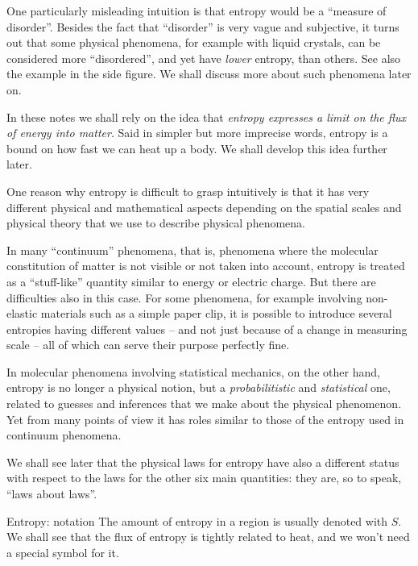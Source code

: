 \documentclass[a4paper,12pt,%
onecolumn,oneside,titlepage,%
british%
]{memoir}
\providecommand{\href}[2]{#2}
\newcommand*{\furl}[2]{\href{#1}{#2}\pagenote{\url{#1}}}
\renewcommand*{\|}[1][]{\nonscript\:#1\vert\nonscript\:\mathopen{}}
\newcommand*{\yS}{S}
\begin{document}
One particularly misleading intuition is that entropy would be a \enquote{measure of disorder}. Besides the fact that \enquote{disorder} is very vague and subjective, it turns out that some physical phenomena, for example with \furl{https://www.britannica.com/science/liquid-crystal}{liquid crystals}, can be considered more \enquote{disordered}, and yet have \emph{lower} entropy, than others. See also the example in the side figure. We shall discuss more about such phenomena later on.

In these notes we shall rely on the idea that \emph{entropy expresses a limit on the flux of energy into matter}. Said in simpler but more imprecise words, entropy is a bound on how fast we can heat up a body. We shall develop this idea further later.

One reason why entropy is difficult to grasp intuitively is that it has very different physical and mathematical aspects depending on the spatial scales and physical theory that we use to describe physical phenomena.

In many \enquote{continuum} phenomena, that is, phenomena where the molecular constitution of matter is not visible or not taken into account, entropy is treated as a \enquote{stuff-like} quantity similar to energy or electric charge. But there are difficulties also in this case. For some phenomena, for example involving non-elastic materials such as a simple paper clip, it is possible to introduce several entropies having different values -- and not just because of a change in measuring scale -- all of which can serve their purpose perfectly fine.

In molecular phenomena involving statistical mechanics, on the other hand, entropy is no longer a physical notion, but a \emph{probabilitistic} and \emph{statistical} one, related to guesses and inferences that we make about the physical phenomenon. Yet from many points of view it has roles similar to those of the entropy used in continuum phenomena.

We shall see later that the physical laws for entropy have also a different status with respect to the laws for the other six main quantities: they are, so to speak, \enquote{laws about laws}.

\smallskip

\begin{definition}{Entropy: notation}
  The amount of entropy in a region is usually denoted with $\yS$. We shall see that the flux of entropy is tightly related to heat, and we won't need a special symbol for it.
\end{definition}
\end{document}
